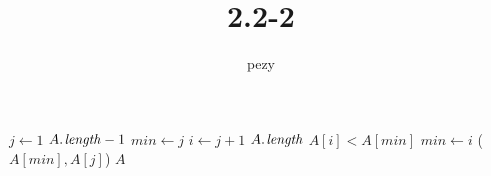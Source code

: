 \documentclass{article}
\begin{document}
	\title{2.2-2}
	\author{pezy}
	\maketitle
	\begin{codebox}
	\li \For $j \gets 1$ \To $\attrib{A}{length} - 1$
	\li \Do	$min \gets j$
	\li		\For $i \gets j + 1$ \To $\attrib{A}{length}$
	\li			\Do \If $A[i] < A[min]$	
	\li					\Do $min \gets i$ 
						\End
				\End
	\li			{}($A[min], A[j]$)
		\End
	\li \Return $A$
	\end{codebox}
\end{document}
